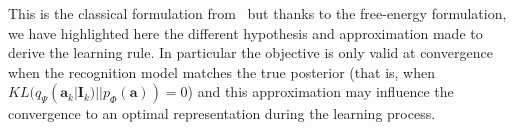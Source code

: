 \documentclass[a4paper, 11pt, draft]{article} %
\newcommand{\coef}{\mathbf{a}} %
\newcommand{\image}{\mathbf{I}} %
\newcommand{\dico}{\Phi} %
\begin{document}
This is the classical formulation from~\citet{Olshausen97} but thanks to the free-energy formulation,  we have highlighted here the different hypothesis and approximation made to derive the learning rule. In particular the objective is only valid at convergence when the recognition model matches the true posterior (that is, when $KL( q_\Psi(\coef_k | \image_k) || p_\dico(\coef) )=0$) and this approximation may influence the convergence to an optimal representation during the learning process.%

\end{document}
